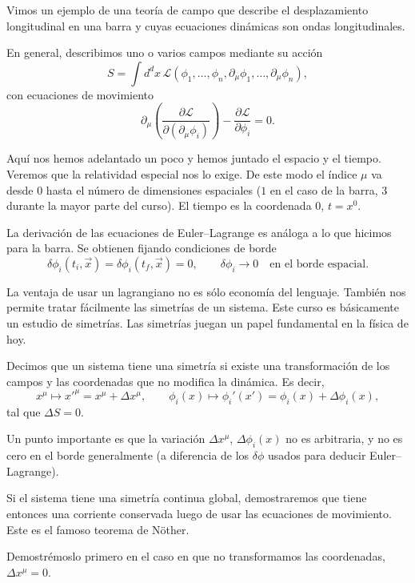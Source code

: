 \documentclass[11pt,a4paper]{article}
\newcommand{\concept}[1]{\textcolor{concept-green}{#1}}
\begin{document}
Vimos un ejemplo de una teoría de campo que describe el desplazamiento longitudinal en una barra y cuyas ecuaciones dinámicas son ondas longitudinales.

En general, describimos uno o varios campos mediante su acción
\[
  S=\int d^dx\,
  \mathcal L(\phi_1,\ldots,\phi_n,
  \partial_\mu\phi_1,\ldots,\partial_\mu\phi_n),
\]
con ecuaciones de movimiento
\[
  \partial_\mu\left(
    \frac{\partial\mathcal L}
         {\partial(\partial_\mu\phi_i)}
  \right)
  -\frac{\partial\mathcal L}{\partial\phi_i}=0.
\]

Aquí nos hemos adelantado un poco y hemos juntado el espacio y el tiempo. Veremos que la relatividad especial nos lo exige. De este modo el índice $\mu$ va desde $0$ hasta el número de dimensiones espaciales ($1$ en el caso de la barra, $3$ durante la mayor parte del curso). El tiempo es la coordenada $0$, $t=x^0$.

La derivación de las ecuaciones de Euler--Lagrange es análoga a lo que hicimos para la barra. Se obtienen fijando condiciones de borde
\[
  \delta\phi_i(t_i,\vec x)=\delta\phi_i(t_f,\vec x)=0,
  \qquad \delta\phi_i\to0\quad\text{en el borde espacial}.
\]

La ventaja de usar un lagrangiano no es sólo economía del lenguaje. También nos permite tratar fácilmente las simetrías de un sistema. Este curso es básicamente un estudio de simetrías. Las simetrías juegan un papel fundamental en la física de hoy.

Decimos que un sistema tiene una simetría si existe una transformación de los campos y las coordenadas que no modifica la dinámica. Es decir,
\[
  x^\mu\longmapsto x'^\mu=x^\mu+\Delta x^\mu,
  \qquad
  \phi_i(x)\longmapsto\phi_i'(x')
  =\phi_i(x)+\Delta\phi_i(x),
\]
tal que $\Delta S=0$.

Un punto importante es que la variación $\Delta x^\mu$, $\Delta\phi_i(x)$ no es arbitraria, y no es cero en el borde generalmente (a diferencia de los $\delta\phi$ usados para deducir Euler--Lagrange).

Si el sistema tiene una simetría continua global, demostraremos que tiene entonces una corriente conservada luego de usar las ecuaciones de movimiento. Este es el famoso \concept{teorema de Nöther}.

Demostrémoslo primero en el caso en que no transformamos las coordenadas, $\Delta x^\mu=0$.
\end{document}
